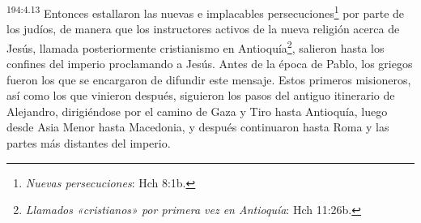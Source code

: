 \par
\textsuperscript{194:4.13} Entonces estallaron las nuevas e implacables persecuciones\footnote{\textit{Nuevas persecuciones}: Hch 8:1b.} por parte de los judíos, de manera que los instructores activos de la nueva religión acerca de Jesús, llamada posteriormente cristianismo en Antioquía\footnote{\textit{Llamados «cristianos» por primera vez en Antioquía}: Hch 11:26b.}, salieron hasta los confines del imperio proclamando a Jesús. Antes de la época de Pablo, los griegos fueron los que se encargaron de difundir este mensaje. Estos primeros misioneros, así como los que vinieron después, siguieron los pasos del antiguo itinerario de Alejandro, dirigiéndose por el camino de Gaza y Tiro hasta Antioquía, luego desde Asia Menor hasta Macedonia, y después continuaron hasta Roma y las partes más distantes del imperio.